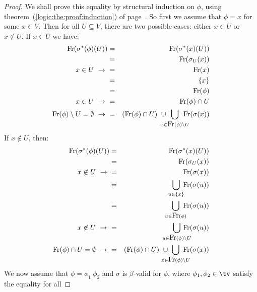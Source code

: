 \begin{proof}
    We shall prove this equality by structural induction on $\phi$, using
    theorem~(\ref{logic:the:proof:induction}) of 
    page~\pageref{logic:the:proof:induction}. So first we assume that $\phi=x$ 
    for some $x\in V$. Then for all $U\subseteq V$, there are two possible 
    cases: either $x\in U$ or $x\not\in U$. If $x\in U$ we have:
    \begin{eqnarray*}
        \free(\sigma^{*}(\phi)(U))
        &=&\free(\sigma^{*}(x)(U))\\
        &=&\free(\sigma_{U}(x))\\
        \mbox{$x\in U\ \rightarrow\ $}&=&\free(x)\\
         &=&\{x\}\\
         &=&\free(\phi)\\
        \mbox{$x\in U\ \rightarrow\ $}&=&\free(\phi)\cap U\\
        \mbox{$\free(\phi)\setminus U = \emptyset\ \rightarrow\ $} &=& 
            (\free(\phi)\cap U)
            \ \cup
            \!\!\!\!\!\!
            \bigcup_{x\in\free(\phi)\setminus U} 
            \!\!\!\!\!\!
            \free(\sigma(x))
    \end{eqnarray*}
    If $x\not\in U$, then:
    \begin{eqnarray*}
        \free(\sigma^{*}(\phi)(U))
        &=&\free(\sigma^{*}(x)(U))\\
        &=&\free(\sigma_{U}(x))\\
        \mbox{$x\not\in U\ \rightarrow\ $}&=&\free(\sigma(x))\\
        &=&
        \!\!\!
        \bigcup_{u\in\{x\}} 
        \!\!
        \free(\sigma(u))\\
        &=&
        \!\!\!\!\!
        \bigcup_{u\in\free(\phi)} 
        \!\!\!\!
        \free(\sigma(u))\\
        \mbox{$x\not\in U\ \rightarrow\ $}
        &=&
        \!\!\!\!\!\!\!\!
        \bigcup_{u\in\free(\phi)\setminus U} 
        \!\!\!\!\!\!\!\!
        \free(\sigma(u))\\
        \mbox{$\free(\phi)\cap U = \emptyset\ \rightarrow\ $} 
        &=& 
        (\free(\phi)\cap U)
        \ \cup
        \!\!\!\!\!\!\!
        \bigcup_{x\in\free(\phi)\setminus U} 
        \!\!\!\!\!\!\!
        \free(\sigma(x))
    \end{eqnarray*}
    We now assume that $\phi=\phi_{1}\ \phi_{2}$ and $\sigma$ is $\beta$-valid 
    for $\phi$, where $\phi_{1}, \phi_{2}\in\tv$ satisfy the equality for all 

\end{proof}
